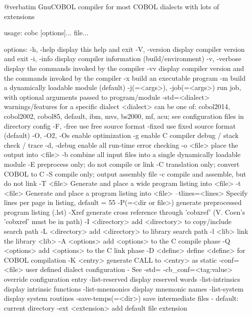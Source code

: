 @verbatim
GnuCOBOL compiler for most COBOL dialects with lots of extensions

usage: cobc [options]... file...

options:
  -h, -help             display this help and exit
  -V, -version          display compiler version and exit
  -i, -info             display compiler information (build/environment)
  -v, -verbose          display the commands invoked by the compiler
  -vv                   display compiler version and the commands
                        invoked by the compiler
  -x                    build an executable program
  -m                    build a dynamically loadable module (default)
  -j(=<args>), -job(=<args>) run job, with optional arguments passed to program/module
  -std=<dialect>        warnings/features for a specific dialect
                        <dialect> can be one of:
                        cobol2014, cobol2002, cobol85, default,
                        ibm, mvs, bs2000, mf, acu;
                        see configuration files in directory config
  -F, -free             use free source format
  -fixed                use fixed source format (default)
  -O, -O2, -Os          enable optimization
  -g                    enable C compiler debug / stack check / trace
  -d, -debug            enable all run-time error checking
  -o <file>             place the output into <file>
  -b                    combine all input files into a single
                        dynamically loadable module
  -E                    preprocess only; do not compile or link
  -C                    translation only; convert COBOL to C
  -S                    compile only; output assembly file
  -c                    compile and assemble, but do not link
  -T <file>             Generate and place a wide program listing into <file>
  -t <file>             Generate and place a program listing into <file>
  --tlines=<lines>      Specify lines per page in listing, default = 55
  -P(=<dir or file>)    generate preprocessed program listing (.lst)
  -Xref                 generate cross reference through 'cobxref'
                        (V. Coen's 'cobxref' must be in path)
  -I <directory>        add <directory> to copy/include search path
  -L <directory>        add <directory> to library search path
  -l <lib>              link the library <lib>
  -A <options>          add <options> to the C compile phase
  -Q <options>          add <options> to the C link phase
  -D <define>           define <define> for COBOL compilation
  -K <entry>            generate CALL to <entry> as static
  -conf=<file>          user defined dialect configuration - See -std=
  -cb_conf=<tag:value>  override configuration entry
  -list-reserved        display reserved words
  -list-intrinsics      display intrinsic functions
  -list-mnemonics       display mnemonic names
  -list-system          display system routines
  -save-temps(=<dir>)   save intermediate files
                        - default: current directory
  -ext <extension>      add default file extension

